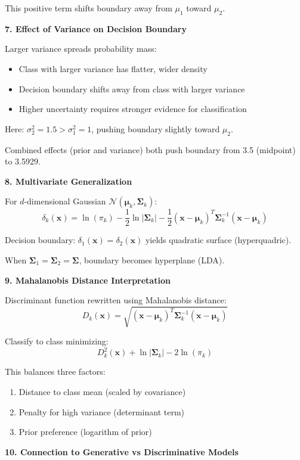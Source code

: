 \documentclass[12pt]{article}
\begin{document}
\begin{explanation}
This positive term shifts boundary away from $\mu_1$ toward $\mu_2$.

\textbf{7. Effect of Variance on Decision Boundary}

Larger variance spreads probability mass:
\begin{itemize}
\item Class with larger variance has flatter, wider density
\item Decision boundary shifts away from class with larger variance
\item Higher uncertainty requires stronger evidence for classification
\end{itemize}

Here: $\sigma_2^2 = 1.5 > \sigma_1^2 = 1$, pushing boundary slightly toward $\mu_2$.

Combined effects (prior and variance) both push boundary from 3.5 (midpoint) to 3.5929.

\textbf{8. Multivariate Generalization}

For $d$-dimensional Gaussian $\mathcal{N}(\boldsymbol{\mu}_k, \boldsymbol{\Sigma}_k)$:
\[\delta_k(\mathbf{x}) = \ln(\pi_k) - \frac{1}{2}\ln|\boldsymbol{\Sigma}_k| - \frac{1}{2}(\mathbf{x} - \boldsymbol{\mu}_k)^T \boldsymbol{\Sigma}_k^{-1} (\mathbf{x} - \boldsymbol{\mu}_k)\]

Decision boundary: $\delta_1(\mathbf{x}) = \delta_2(\mathbf{x})$ yields quadratic surface (hyperquadric).

When $\boldsymbol{\Sigma}_1 = \boldsymbol{\Sigma}_2 = \boldsymbol{\Sigma}$, boundary becomes hyperplane (LDA).

\textbf{9. Mahalanobis Distance Interpretation}

Discriminant function rewritten using Mahalanobis distance:
\[D_k(\mathbf{x}) = \sqrt{(\mathbf{x} - \boldsymbol{\mu}_k)^T \boldsymbol{\Sigma}_k^{-1} (\mathbf{x} - \boldsymbol{\mu}_k)}\]

Classify to class minimizing:
\[D_k^2(\mathbf{x}) + \ln|\boldsymbol{\Sigma}_k| - 2\ln(\pi_k)\]

This balances three factors:
\begin{enumerate}
\item Distance to class mean (scaled by covariance)
\item Penalty for high variance (determinant term)
\item Prior preference (logarithm of prior)
\end{enumerate}

\textbf{10. Connection to Generative vs Discriminative Models}


\end{explanation}
\end{document}
